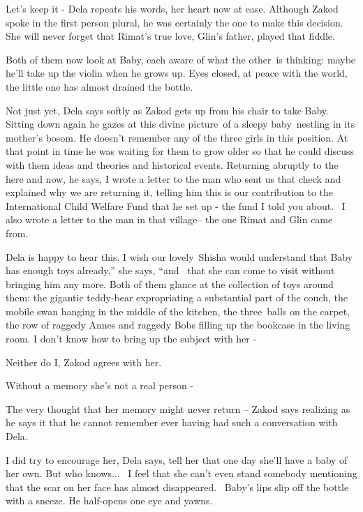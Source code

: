 \documentclass[letterpaper]{article}
\begin{document}
{\textquotedbl}Let's keep it -{\textquotedbl} Dela repeats his words, her heart now at ease. Although Zakod spoke in the
first person plural, he was certainly the one to make this decision. She will never forget that Rimat's true love,
Glin's father, played that fiddle. 

Both of them now look at Baby, each aware of what the other~is thinking: maybe he'll take up the violin when he grows
up. Eyes closed, at peace with the world, the little one has almost drained the bottle.

{\textquotedbl}Not just yet,{\textquotedbl} Dela says softly as Zakod gets up from his chair to take Baby. Sitting down
again he gazes at this divine picture~of a sleepy baby~nestling in its mother's bosom. He doesn't remember any of the
three girls in this position. At that point in time he was waiting for them to grow older so that he could discuss with
them ideas and theories and historical events. Returning abruptly to the here and now, he says, {\textquotedbl}I wrote
a letter to the man who sent us that check and explained why we are returning it, telling him this is our contribution
to the International Child Welfare Fund that he set up - the fund I told you about. ~I also wrote a letter to the man
in that village-- the one Rimat and Glin came from.{\textquotedbl} 

Dela is happy to hear this. {\textquotedbl}I wish our lovely~Shisha would understand that Baby has enough toys
already,'' she says, ``and \ that she can come to visit without bringing him any more.{\textquotedbl} Both of them
glance at the collection of toys around them: the gigantic teddy-bear expropriating a substantial part of the couch,
the mobile swan hanging in the middle of the kitchen, the three~balls on the carpet, the row of raggedy Annes and
raggedy Bobs filling up the bookcase in the living room. {\textquotedbl}I don't know how to bring up the subject with
her -{\textquotedbl} 

{\textquotedbl}Neither do I,{\textquotedbl} Zakod agrees with her.

{\textquotedbl}Without a memory she's not a real person -{\textquotedbl} 

{\textquotedbl}The very thought that her memory might never return -- {\textquotedbl} Zakod says realizing as he says it
that he cannot remember ever having had such a conversation with Dela. 

{\textquotedbl}I did try to encourage her,{\textquotedbl} Dela says, {\textquotedbl}tell her that one day she'll have a
baby of her own. But who knows...~ I feel that she can't even stand somebody mentioning that the scar on her face has
almost disappeared.{\textquotedbl} \ Baby's lips slip off the bottle with a sneeze. He half-opens one eye and yawns. 
\end{document}
